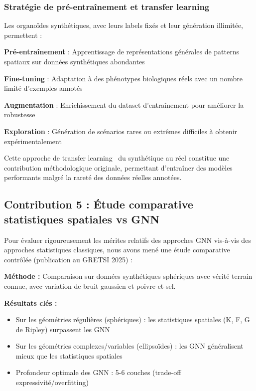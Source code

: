 \subsubsection{Stratégie de pré-entraînement et transfer learning}

Les organoïdes synthétiques, avec leurs labels fixés et leur génération illimitée, permettent :

\textbf{Pré-entraînement} : Apprentissage de représentations générales de patterns spatiaux sur données synthétiques abondantes

\textbf{Fine-tuning} : Adaptation à des phénotypes biologiques réels avec un nombre limité d'exemples annotés

\textbf{Augmentation} : Enrichissement du dataset d'entraînement pour améliorer la robustesse

\textbf{Exploration} : Génération de scénarios rares ou extrêmes difficiles à obtenir expérimentalement

Cette approche de transfer learning~\cite{Pan2010,Weiss2016} du synthétique au réel constitue une contribution méthodologique originale, permettant d'entraîner des modèles performants malgré la rareté des données réelles annotées.

\subsection{Contribution 5 : Étude comparative statistiques spatiales vs GNN}

Pour évaluer rigoureusement les mérites relatifs des approches GNN vis-à-vis des approches statistiques classiques, nous avons mené une étude comparative contrôlée (publication au GRETSI 2025) :

\textbf{Méthode :}
Comparaison sur données synthétiques sphériques avec vérité terrain connue, avec variation de bruit gaussien et poivre-et-sel.

\textbf{Résultats clés :}
\begin{itemize}
    \item Sur les géométries régulières (sphériques) : les statistiques spatiales (K, F, G de Ripley) surpassent les GNN
    \item Sur les géométries complexes/variables (ellipsoïdes) : les GNN généralisent mieux que les statistiques spatiales
    \item Profondeur optimale des GNN : 5-6 couches (trade-off expressivité/overfitting)
\end{itemize}

